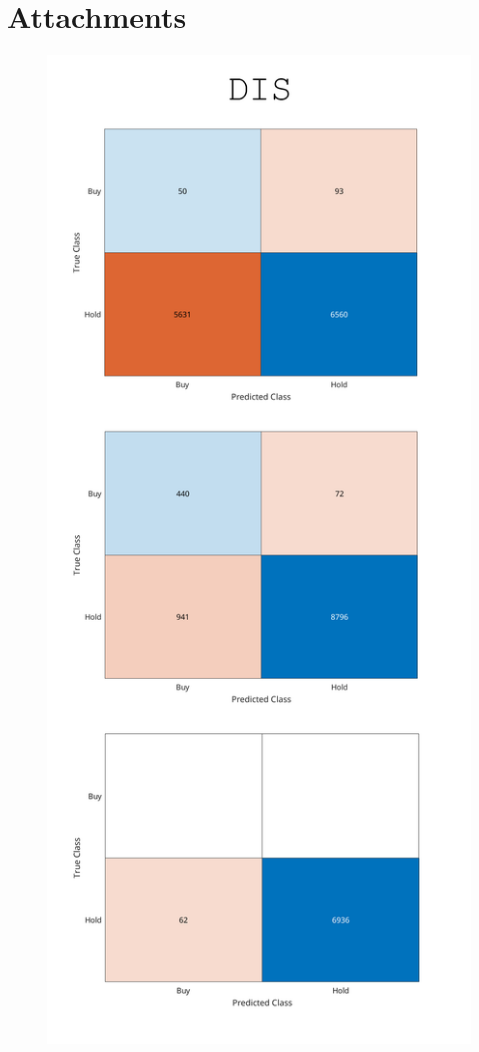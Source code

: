 \documentclass[a4paper,oneside,onecolumn,12pt]{book}
\begin{document}
\section*{Attachments}
\begin{figure}[H]
\begin{center}
	\includegraphics[height=0.8\textheight, keepaspectratio]{kep/DIS2.png}
\end{center}
\end{figure}
\end{document}
